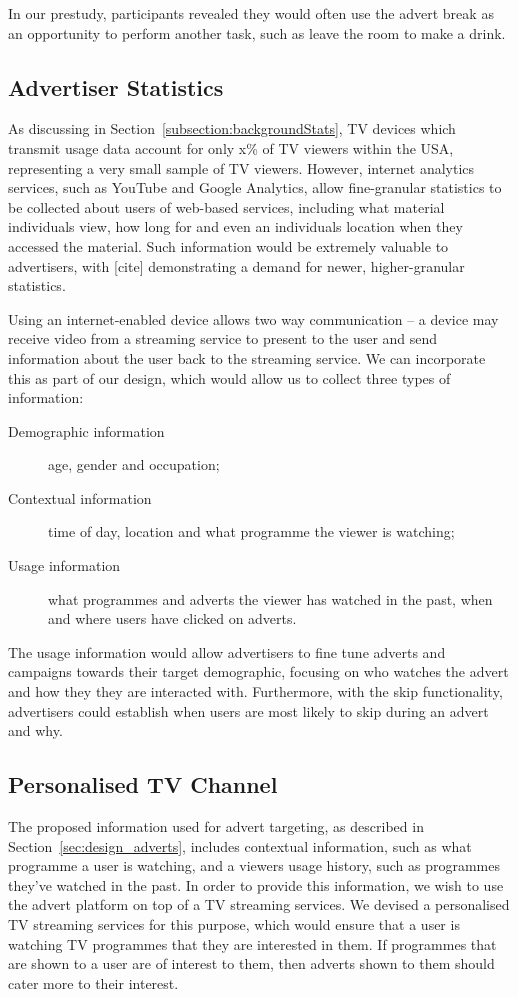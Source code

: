 	In our prestudy, participants revealed they would often use the advert break as an opportunity to perform another task, such as leave the room to make a drink.

\subsection{Advertiser Statistics}

	As discussing in Section~\ref{subsection:backgroundStats}, TV devices which transmit usage data account for only x\% of TV viewers within the USA, representing a very small sample of TV viewers. However, internet analytics services, such as YouTube and Google Analytics, allow fine-granular statistics to be collected about users of web-based services, including what material individuals view, how long for and even an individuals location when they accessed the material. Such information would be extremely valuable to advertisers, with [cite] demonstrating a demand for newer, higher-granular statistics.

	Using an internet-enabled device allows two way communication -- a device may receive video from a streaming service to present to the user and send information about the user back to the streaming service. We can incorporate this as part of our design, which would allow us to collect three types of information:
	\begin{description}
	\item[Demographic information] age, gender and occupation;
	\item[Contextual information] time of day, location and what programme the viewer is watching;
	\item[Usage information] what programmes and adverts the viewer has watched in the past, when and where users have clicked on adverts.
	\end{description}

	The usage information would allow advertisers to fine tune adverts and campaigns towards their target demographic, focusing on who watches the advert and how they they are interacted with. Furthermore, with the skip functionality, advertisers could establish when users are most likely to skip during an advert and why.

\subsection{Personalised TV Channel}

	The proposed information used for advert targeting, as described in Section~\ref{sec:design_adverts}, includes contextual information, such as what programme a user is watching, and a viewers usage history, such as programmes they've watched in the past. In order to provide this information, we wish to use the advert platform on top of a TV streaming services. We devised a personalised TV streaming services for this purpose, which would ensure that a user is watching TV programmes that they are interested in them. If programmes that are shown to a user are of interest to them, then adverts shown to them should cater more to their interest.

